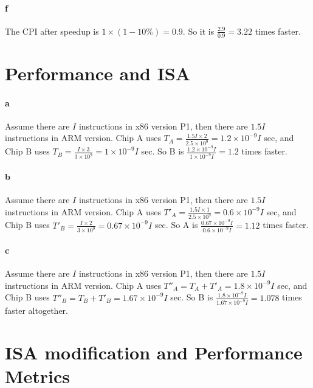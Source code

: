 \documentclass[12pt,letterpaper]{article}
\begin{document}
\paragraph*{f}
The CPI after speedup is $1\times (1-10\%) = 0.9$.
So it is $\frac{2.9}{0.9}=3.22$ times faster.

\section{Performance and ISA}
\paragraph*{a}
Assume there are $I$ instructions in x86 version P1, then there are $1.5I$ 
instructions in ARM version.
Chip A uses $T_A = \frac{1.5I \times 2}{2.5 \times 10^9} = 
1.2\times 10^{-9}I$ sec, and Chip B uses $T_B = \frac{I\times 3}{3\times10^9}
 = 1\times10^{-9}I$
sec. So B is $\frac{1.2\times 10^{-9}I}{1\times10^{-9}I} = 1.2$ times faster.

\paragraph*{b}
Assume there are $I$ instructions in x86 version P1, then there are $1.5I$ 
instructions in ARM version.
Chip A uses $T'_A = \frac{1.5I \times 1}{2.5 \times 10^9} = 
0.6\times 10^{-9}I$ sec, and Chip B uses $T'_B = \frac{I\times 2}{3\times10^9}
 = 0.67\times10^{-9}I$
sec. So A is $\frac{0.67\times 10^{-9}I}{0.6\times10^{-9}I} = 1.12$ times 
faster.

\paragraph*{c}
Assume there are $I$ instructions in x86 version P1, then there are $1.5I$ 
instructions in ARM version.
Chip A uses $T''_A =  T_A + T'_A = 1.8\times 10^{-9}I$ sec, and Chip B uses 
$T''_B = T_B + T'_B  = 1.67\times10^{-9}I$ sec. So B is $\frac{1.8\times 
10^{-9}I}{1.67\times10^{-9}I} = 1.078$ times faster altogether.


\section{ISA modification and Performance Metrics}
\end{document}
